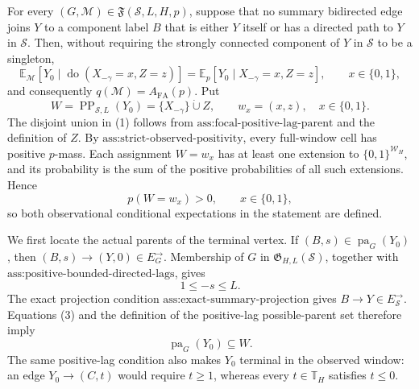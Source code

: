 For every \((G,\mathcal M)\in\mathfrak F(\mathcal S,L,H,p)\), suppose that no summary bidirected edge joins \(Y\) to a component label \(B\) that is either \(Y\) itself or has a directed path to \(Y\) in \(\mathcal S\). Then, without requiring the strongly connected component of \(Y\) in \(\mathcal S\) to be a singleton,
\[
\mathbb E_{\mathcal M}[Y_0\mid\operatorname{do}(X_{-\gamma}=x,Z=z)]
=\mathbb E_p[Y_0\mid X_{-\gamma}=x,Z=z],\qquad x\in\{0,1\},
\]
and consequently \(q(\mathcal M)=A_{\mathrm{FA}}(p)\).
Put
\[
W=\operatorname{PP}_{\mathcal S,L}(Y_0)
=\{X_{-\gamma}\}\mathbin{\dot\cup}Z,
\qquad w_x=(x,z),\quad x\in\{0,1\}.
\tag{1}
\]
The disjoint union in (1) follows from \(\text{ass:focal-positive-lag-parent}\) and the definition of \(Z\). By \(\text{ass:strict-observed-positivity}\), every full-window cell has positive \(p\)-mass. Each assignment \(W=w_x\) has at least one extension to \(\{0,1\}^{\mathcal W_H}\), and its probability is the sum of the positive probabilities of all such extensions. Hence
\[
p(W=w_x)>0,\qquad x\in\{0,1\},
\tag{2}
\]
so both observational conditional expectations in the statement are defined.

We first locate the actual parents of the terminal vertex. If \((B,s)\in\operatorname{pa}_G(Y_0)\), then \((B,s)\to(Y,0)\in E_G^{\to}\). Membership of \(G\) in \(\mathfrak G_{H,L}(\mathcal S)\), together with \(\text{ass:positive-bounded-directed-lags}\), gives
\[
1\le -s\le L.
\tag{3}
\]
The exact projection condition \(\text{ass:exact-summary-projection}\) gives \(B\to Y\in E_{\mathcal S}^{\to}\). Equations (3) and the definition of the positive-lag possible-parent set therefore imply
\[
\operatorname{pa}_G(Y_0)\subseteq W.
\tag{4}
\]
The same positive-lag condition also makes \(Y_0\) terminal in the observed window: an edge \(Y_0\to(C,t)\) would require \(t\ge1\), whereas every \(t\in\mathbb T_H\) satisfies \(t\le0\).


